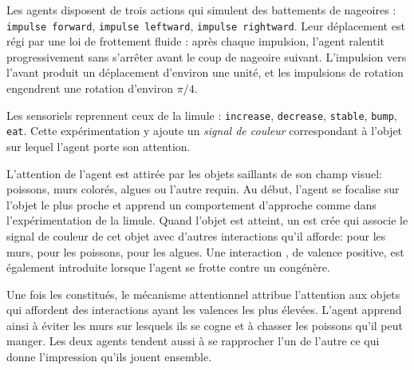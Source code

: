 Les agents disposent de trois actions qui simulent des battements de nageoires : \texttt{impulse forward}, \texttt{impulse leftward}, \texttt{impulse rightward}. 
Leur déplacement est régi par une loi de frottement fluide : après chaque impulsion, l'agent ralentit progressivement sans s'arrêter avant le coup de nageoire suivant. 
L'impulsion vers l'avant produit un déplacement d'environ une unité, et les impulsions de rotation engendrent une rotation d'environ $\pi/4$.

Les  sensoriels reprennent ceux de la limule : \texttt{increase}, \texttt{decrease}, \texttt{stable}, \texttt{bump}, \texttt{eat}.
Cette expérimentation y ajoute un \emph{signal de couleur} correspondant à l'objet sur lequel l'agent porte son attention.


L'attention de l'agent est attirée par les objets saillants de son champ visuel: poissons, murs colorés, algues ou l'autre requin.
Au début, l'agent se focalise sur l'objet le plus proche et apprend un comportement d'approche comme dans l'expérimentation de la limule. 
Quand l'objet est atteint, un  est crée qui associe le signal de couleur de cet objet avec d'autres interactions qu'il afforde:  pour les murs,  pour les poissons,  pour les algues. 
Une interaction , de valence positive, est également introduite lorsque l'agent se frotte contre un congénère.

Une fois les  constitués, le mécanisme attentionnel attribue l'attention aux objets qui affordent des interactions ayant les valences les plus élevées. 
L'agent apprend ainsi à éviter les murs sur lesquels ils se cogne et à chasser les poissons qu'il peut manger. 
Les deux agents tendent aussi à se rapprocher l'un de l'autre ce qui donne l'impression qu'ils jouent ensemble.




